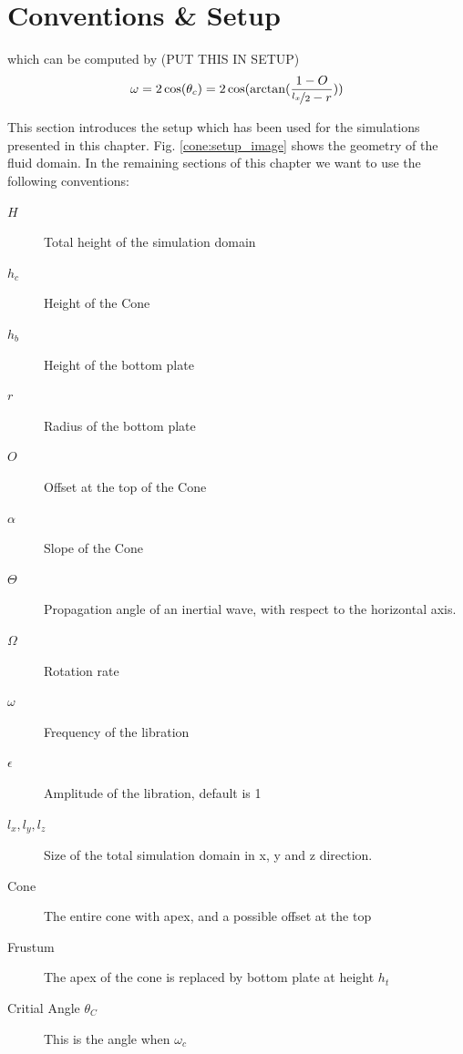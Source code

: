 \newpage

\section{Conventions \& Setup}
\label{cone:convsetup}

which can be computed by (PUT THIS IN SETUP)
\begin{align}
    \omega = 2\cos(\theta_c) = 2\cos(\arctan(\frac{1 - O}{\nicefrac{l_x}{2} - r}))
\end{align}

This section introduces the setup which has been used for the simulations presented in this chapter.
Fig. \ref{cone:setup_image} shows the geometry of the fluid domain.
In the remaining sections of this chapter we want to use the following conventions:

\begin{multicols}{2}
\begin{description}
    \item[$H$]{Total height of the simulation domain}
    \item[$h_c$]{Height of the Cone}
    \item[$h_b$]{Height of the bottom plate}
    \item[$r$]{Radius of the bottom plate}
    \item[$O$]{Offset at the top of the Cone}
    \item[$\alpha$]{Slope of the Cone}
    \item[$\Theta$]{Propagation angle of an inertial wave, with respect to the horizontal axis.}
    \item[$\Omega$]{Rotation rate}
    \item[$\omega$]{Frequency of the libration}
    \item[$\epsilon$]{Amplitude of the libration, default is 1}%
    \item[$l_x, l_y, l_z$]{Size of the total simulation domain in x, y and z direction.}
    \item[Cone] {The entire cone with apex, and a possible offset at the top}
    \item[Frustum]{The apex of the cone is replaced by bottom plate at height $h_t$}
    \item[Critial Angle $\theta_C$]{This is the angle when $\omega_c$}
\end{description}
\end{multicols}


